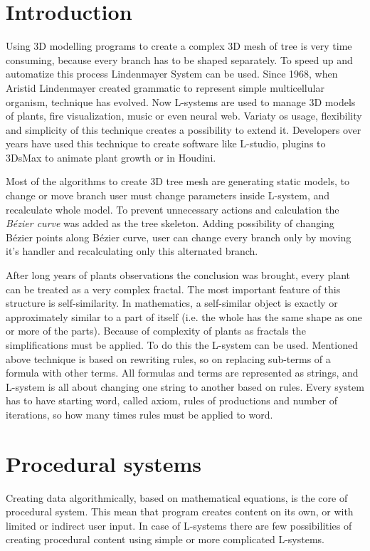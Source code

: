\documentclass[b5paper,twoside,11pt]{article}
\begin{document}
\section{Introduction}
Using 3D modelling programs to create a complex 3D mesh of tree is very time consuming, because every branch has to be shaped separately.
To speed up and automatize this process Lindenmayer System can be used. Since 1968, when Aristid Lindenmayer created  grammatic to represent simple multicellular organism, technique has evolved. Now L-systems are used to manage 3D models of plants\cite{Herbaceus, WebTree, Spray, wlosy, EnviroTree}, fire visualization\cite{Sim}, music\cite{MLSystem} or even neural web\cite{LBrain}. Variaty os usage, flexibility and simplicity of this technique creates a possibility to extend it. Developers over years have used this technique to create software like L-studio\cite{L-Studio}, plugins to 3DsMax to animate plant growth\cite{ABartniak} or in Houdini\cite{LHoud}. \par Most of the algorithms to create 3D tree mesh are generating static models, to change or move branch user must change parameters inside L-system, and recalculate whole model. To prevent unnecessary actions and calculation the \textit{Bézier curve} was added as the tree skeleton. Adding possibility of changing Bézier points along Bézier curve, user can change every branch only by moving it's handler and recalculating only this alternated branch.
\par After long years of plants observations the conclusion was brought, every plant can be treated as a very complex fractal. The most important feature of this structure is self-similarity. In mathematics, a self-similar object is exactly or approximately similar to a part of itself (i.e. the whole has the same shape as one or more of the parts)\cite{SelfSimi}. Because of complexity of plants as fractals the simplifications must be applied. To do this the L-system can be used.
Mentioned above technique is based on rewriting rules, so on replacing sub-terms of a formula with other terms. All formulas and terms are represented as strings, and L-system is all about changing one string to another based on rules. Every system has to have starting word, called axiom, rules of productions and number of iterations, so how many times rules must be applied to word. 

\section{Procedural systems}
Creating data algorithmically, based on mathematical equations, is the core of procedural system.  This mean that program creates content on its own, or with limited or indirect user input. In case of L-systems there are few possibilities of creating procedural content using simple or more complicated L-systems.
\end{document}
